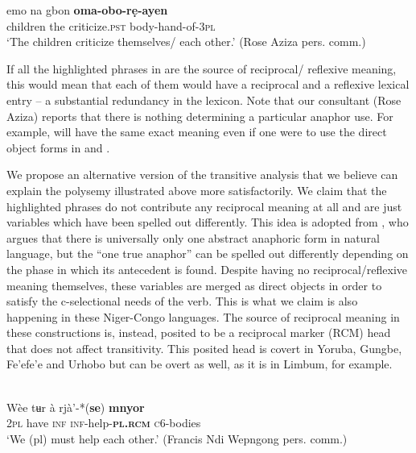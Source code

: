 \documentclass[output=paper]{langsci/langscibook}
\begin{document}
\ex
\gll emo    na    gbon     \textbf{oma-obo-rẹ-ayen} \\
       children  the  criticize.\textsc{pst}   body-hand-of-\textsc{3pl}\\
\glt   ‘The children criticize themselves/ each other.’ (Rose Aziza pers. comm.)
\z
\z

If all the highlighted phrases in  are the source of reciprocal/ reflexive meaning, this would mean that each of them would have a reciprocal and a reflexive lexical entry – a substantial redundancy in the lexicon. Note that our consultant (Rose Aziza) reports that there is nothing determining a particular anaphor use. For example,  will have the same exact meaning even if one were to use the direct object forms in  and . 

We propose an alternative version of the transitive analysis that we believe can explain the polysemy illustrated above more satisfactorily. We claim that the highlighted phrases do not contribute any reciprocal meaning at all and are just variables which have been spelled out differently. This idea is adopted from \citet{Safir2014}, who argues that there is universally only one abstract anaphoric form in natural language, but the “one true anaphor” can be spelled out differently depending on the phase in which its antecedent is found. Despite having no reciprocal/reflexive meaning themselves, these variables are merged as direct objects in order to satisfy the c-selectional needs of the verb. This is what we claim is also happening in these Niger-Congo languages. The source of reciprocal meaning in these constructions is, instead, posited to be a reciprocal marker (RCM) head that does not affect transitivity. This posited head is covert in Yoruba, Gungbe, Fe'efe'e and Urhobo but can be overt as well, as it is in Limbum, for example.


\ea\label{ex:}
\\
\gll Wèe  tʉr  à  rjà’-*(\textbf{se})    \textbf{{mnyor}} \\
\textsc{2pl}  have  \textsc{inf}  \textsc{inf}-help-\textbf{\textsc{pl.rcm}}  \textsc{c}6-bodies \\
\glt ‘We (pl) must help each other.’ {(}Francis Ndi Wepngong pers. comm.{)} 
\z
\end{document}
